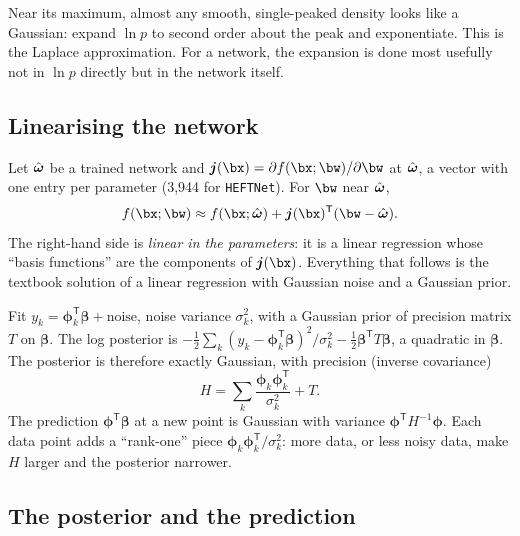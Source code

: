 Near its maximum, almost any smooth, single-peaked density looks like a Gaussian: expand
$\ln p$ to second order about the peak and exponentiate. This is the Laplace approximation.
For a network, the expansion is done most usefully not in $\ln p$ directly but in the
network itself.

\subsection{Linearising the network}

Let $\hat{\boldsymbol{\omega}}$ be a trained network and $\bj(\bx) = \partial f(\bx;\bw)/\partial\bw$ at
$\hat{\boldsymbol{\omega}}$, a vector with one entry per parameter (3,944 for \texttt{HEFTNet}). For $\bw$ near
$\hat{\boldsymbol{\omega}}$,
\begin{equation}
  f(\bx;\bw) \approx f(\bx;\what) + \bj(\bx)^{\mathsf T}(\bw - \what) .
  \label{eq:lin}
\end{equation}
The right-hand side is \emph{linear in the parameters}: it is a linear regression whose
``basis functions'' are the components of $\bj(\bx)$. Everything that follows is the
textbook solution of a linear regression with Gaussian noise and a Gaussian prior.

\begin{keyidea}
Fit $y_k = \boldsymbol{\phi}_k^{\mathsf T}\boldsymbol{\beta} + \text{noise}$, noise variance
$\sigma_k^2$, with a Gaussian prior of precision matrix $T$ on $\boldsymbol{\beta}$. The
log posterior is
$-\tfrac12\sum_k (y_k - \boldsymbol{\phi}_k^{\mathsf T}\boldsymbol{\beta})^2/\sigma_k^2
- \tfrac12 \boldsymbol{\beta}^{\mathsf T} T \boldsymbol{\beta}$, a quadratic in
$\boldsymbol{\beta}$. The posterior is therefore exactly Gaussian, with precision (inverse
covariance)
\[
  H = \sum_k \frac{\boldsymbol{\phi}_k \boldsymbol{\phi}_k^{\mathsf T}}{\sigma_k^2} + T .
\]
The prediction $\boldsymbol{\phi}^{\mathsf T}\boldsymbol{\beta}$ at a new point is Gaussian
with variance $\boldsymbol{\phi}^{\mathsf T} H^{-1} \boldsymbol{\phi}$. Each data point
adds a ``rank-one'' piece $\boldsymbol{\phi}_k\boldsymbol{\phi}_k^{\mathsf T}/\sigma_k^2$:
more data, or less noisy data, make $H$ larger and the posterior narrower.
\end{keyidea}

\subsection{The posterior and the prediction}


